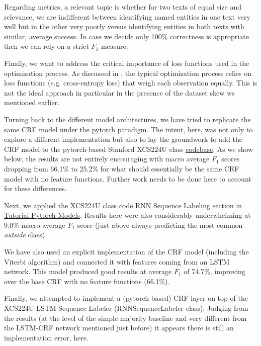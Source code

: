 \documentclass[11pt]{article}
\begin{document}
Regarding metrics, a relevant topic is whether for two texts of equal size and relevance, we are indifferent between identifying named entities in one text very well but in the other very poorly versus identifying entities in both texts with similar, average success. In case we decide only 100\% correctness is appropriate then we can rely on a strict $F_1$ measure.

Finally, we want to address the critical importance of loss functions used in the optimization process. As discussed in \citet{li-etal-2020-dice}, the typical optimization process relies on loss functions (e.g. cross-entropy loss) that weigh each observation equally. This is not the ideal approach in particular in the presence of the dataset skew we mentioned earlier.

Turning back to the different model architectures, we have tried to replicate the same CRF model under the \href{https://pytorch-crf.readthedocs.io/en/stable/}{pytorch} paradigm. The intent, here, was not only to explore a different implementation but also to lay the groundwork to add the CRF model to the pytorch-based Stanford XCS224U class  \href{https://github.com/cgpotts/cs224u}{codebase}. As we show below, the results are not entirely encouraging with macro average $F_1$ scores dropping from 66.1\% to 25.2\% for what should essentially be the same CRF model with no feature functions. Further work needs to be done here to account for these differences.

Next, we applied the XCS224U class code RNN Sequence Labeling section in \href{https://github.com/cgpotts/cs224u/blob/master/tutorial_pytorch_models.ipynb}{Tutorial Pytorch Models}. Results here were also considerably underwhelming at 9.0\% macro average $F_1$ score (just above always predicting the most common \emph{outside} class).

We have also used an explicit implementation of the CRF model (including the Viterbi algorithm) and connected it with features coming from an LSTM network. This model produced good results at average $F_1$ of 74.7\%, improving over the base CRF with no feature functions (66.1\%).

Finally, we attempted to implement a (pytorch-based) CRF layer on top of the XCS224U LSTM Sequence Labeler (RNNSequenceLabeler class). Judging from the results (at the level of the simple majority baseline and very different from the LSTM-CRF network mentioned just before) it appears there is still an implementation error, here.
\end{document}
